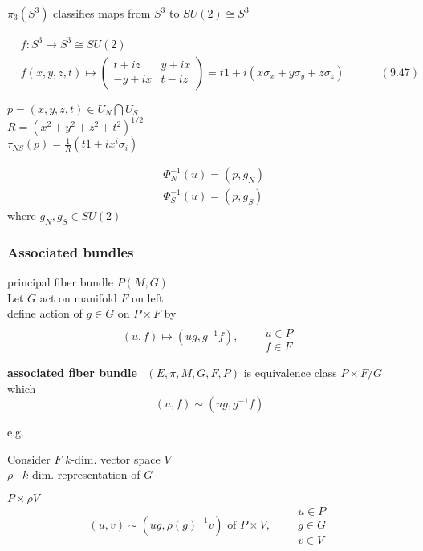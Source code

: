 \documentclass[twoside]{amsart}
\begin{document}
$\pi_3(S^3)$ classifies maps from $S^3$ to $SU(2) \cong S^3$


\begin{equation}
  \begin{aligned}
    & f:S^3 \to S^3 \cong SU(2) \\ 
    & f(x,y,z,t) \mapsto \left( \begin{matrix} t + iz & y + ix \\ 
      -y +ix & t-iz \end{matrix} \right) = t1 + i (x \sigma_x + y \sigma_y + z \sigma_z ) \quad \quad \quad \, (9.47)
\end{aligned}
\end{equation}

$p = (x,y,z,t) \in U_N \bigcap U_S$ \\
$R = (x^2 + y^2 + z^2 + t^2)^{1/2}$ \\

$\tau_{NS}{(p)} = \frac{1}{R}(t1 + ix^i \sigma_i)$

\[
\begin{aligned}
  & \Phi_N^{-1}(u) = (p,g_N) \\ 
  & \Phi_S^{-1}(u) = (p,g_S)
\end{aligned}
\]
where $g_N, g_S \in SU(2)$



\subsubsection{ Associated bundles }

principal fiber bundle $P(M,G)$ \\
Let $G$ act on manifold $F$ on left  \\

define action of $g \in G$ on $P\times F$ by 
\[
(u,f) \mapsto (ug, g^{-1}f), \quad \, \begin{aligned} & \quad \\
  & u \in P \\
& f \in F \end{aligned}
\]

\textbf{associated fiber bundle } \, $(E, \pi, M, G, F, P)$ is equivalence class $P \times F/ G$ which 
\[
(u, f) \sim ( ug, g^{-1}f)
\]

e.g.  

Consider $F$ $k$-dim. vector space $V$ \\
\quad $\rho$ \, $k$-dim. representation of $G$

$P\times \rho V$ 
\[
(u,v) \sim (ug, \rho(g)^{-1} v) \text{ of } P \times V, \quad \, \begin{aligned} 
  & u \in P \\
& g \in G \\
  & v \in V \end{aligned}
\]
\end{document}

